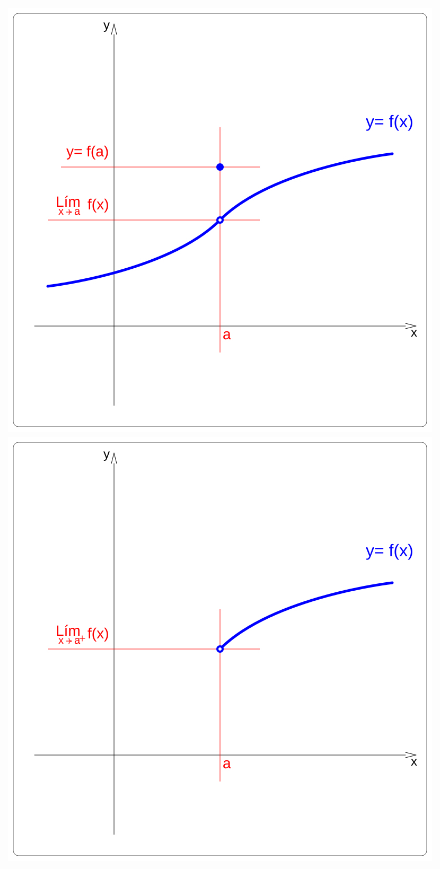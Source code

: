 \begin{figure}[hbp]
\centering
\includegraphics[scale=0.195]{img/Funs/funcion_xy_discontin_4hStg}
\label{fig::fun-tipos-discontinuidad}
\includegraphics[scale=0.195]{img/Funs/funcion_xy_discontin_4jSGg}

\end{figure}
